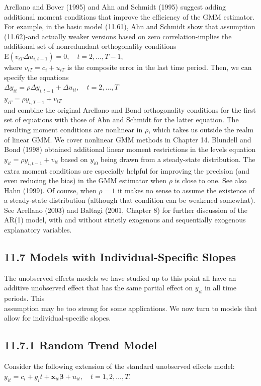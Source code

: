\documentclass[10pt]{article}
\begin{document}
Arellano and Bover (1995) and Ahn and Schmidt (1995) suggest adding additional moment conditions that improve the efficiency of the GMM estimator. For example, in the basic model (11.61), Ahn and Schmidt show that assumption (11.62)-and actually weaker versions based on zero correlation-implies the additional set of nonredundant orthogonality conditions\\
$\mathrm{E}\left(v_{i T} \Delta u_{i, t-1}\right)=0, \quad t=2, \ldots, T-1$,\\
where $v_{i T}=c_{i}+u_{i T}$ is the composite error in the last time period. Then, we can specify the equations\\
$\Delta y_{i t}=\rho \Delta y_{i, t-1}+\Delta u_{i t}, \quad t=2, \ldots, T$\\
$y_{i T}=\rho y_{i, T-1}+v_{i T}$\\
and combine the original Arellano and Bond orthogonality conditions for the first set of equations with those of Ahn and Schmidt for the latter equation. The resulting moment conditions are nonlinear in $\rho$, which takes us outside the realm of linear GMM. We cover nonlinear GMM methods in Chapter 14. Blundell and Bond (1998) obtained additional linear moment restrictions in the levels equation $y_{i t}=\rho y_{i, t-1}+ v_{i t}$ based on $y_{i 0}$ being drawn from a steady-state distribution. The extra moment conditions are especially helpful for improving the precision (and even reducing the bias) in the GMM estimator when $\rho$ is close to one. See also Hahn (1999). Of course, when $\rho=1$ it makes no sense to assume the existence of a steady-state distribution (although that condition can be weakened somewhat). See Arellano (2003) and Baltagi (2001, Chapter 8) for further discussion of the AR(1) model, with and without strictly exogenous and sequentially exogenous explanatory variables.

\subsection*{11.7 Models with Individual-Specific Slopes}
The unobserved effects models we have studied up to this point all have an additive unobserved effect that has the same partial effect on $y_{i t}$ in all time periods. This\\
assumption may be too strong for some applications. We now turn to models that allow for individual-specific slopes.

\subsection*{11.7.1 Random Trend Model}
Consider the following extension of the standard unobserved effects model:\\
$y_{i t}=c_{i}+g_{i} t+\mathbf{x}_{i t} \boldsymbol{\beta}+u_{i t}, \quad t=1,2, \ldots, T$.
\end{document}
